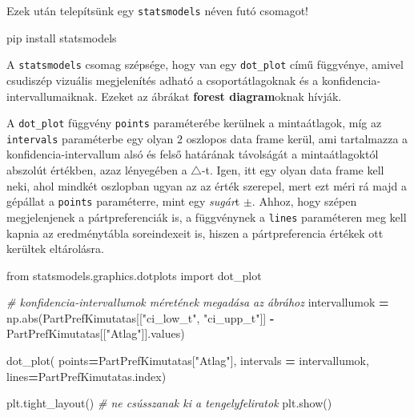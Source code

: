\documentclass[
]{book}
\newenvironment{Shaded}{\begin{snugshade}}{\end{snugshade}}
\newcommand{\BuiltInTok}[1]{#1}
\newcommand{\CommentTok}[1]{\textcolor[rgb]{0.56,0.35,0.01}{\textit{#1}}}
\newcommand{\ImportTok}[1]{#1}
\newcommand{\NormalTok}[1]{#1}
\newcommand{\OperatorTok}[1]{\textcolor[rgb]{0.81,0.36,0.00}{\textbf{#1}}}
\newcommand{\StringTok}[1]{\textcolor[rgb]{0.31,0.60,0.02}{#1}}
\begin{document}
Ezek után telepítsünk egy \texttt{statsmodels} néven futó csomagot!

\begin{Shaded}
\begin{Highlighting}[]
\NormalTok{pip install statsmodels}
\end{Highlighting}
\end{Shaded}

A \texttt{statsmodels} csomag szépsége, hogy van egy \texttt{dot\_plot} című függvénye, amivel csudiszép vizuális megjelenítés adható a csoportátlagoknak és a konfidencia-intervallumaiknak. Ezeket az ábrákat \textbf{forest diagram}oknak hívják.

A \texttt{dot\_plot} függvény \texttt{points} paraméterébe kerülnek a mintaátlagok, míg az \texttt{intervals} paraméterbe egy olyan \(2\) oszlopos data frame kerül, ami tartalmazza a konfidencia-intervallum alsó és felső határának távolságát a mintaátlagoktól abszolút értékben, azaz lényegében a \(\triangle\)-t. Igen, itt egy olyan data frame kell neki, ahol mindkét oszlopban ugyan az az érték szerepel, mert ezt méri rá majd a gépállat a \texttt{points} paraméterre, mint egy \emph{sugár}t \(\pm\).
Ahhoz, hogy szépen megjelenjenek a pártpreferenciák is, a függvénynek a \texttt{lines} paraméteren meg kell kapnia az eredménytábla soreindexeit is, hiszen a pártpreferencia értékek ott kerültek eltárolásra.

\begin{Shaded}
\begin{Highlighting}[]
\ImportTok{from}\NormalTok{ statsmodels.graphics.dotplots }\ImportTok{import}\NormalTok{ dot\_plot}

\CommentTok{\# konfidencia{-}intervallumok méretének megadása az ábrához}
\NormalTok{intervallumok }\OperatorTok{=}\NormalTok{ np.}\BuiltInTok{abs}\NormalTok{(PartPrefKimutatas[[}\StringTok{"ci\_low\_t"}\NormalTok{, }\StringTok{"ci\_upp\_t"}\NormalTok{]] }\OperatorTok{{-}}\NormalTok{ PartPrefKimutatas[[}\StringTok{"Atlag"}\NormalTok{]].values)}

\NormalTok{dot\_plot(}
\NormalTok{  points}\OperatorTok{=}\NormalTok{PartPrefKimutatas[}\StringTok{"Atlag"}\NormalTok{],}
\NormalTok{  intervals }\OperatorTok{=}\NormalTok{ intervallumok,}
\NormalTok{  lines}\OperatorTok{=}\NormalTok{PartPrefKimutatas.index)}

\NormalTok{plt.tight\_layout() }\CommentTok{\# ne csússzanak ki a tengelyfeliratok}
\NormalTok{plt.show()}
\end{Highlighting}
\end{Shaded}
\end{document}
